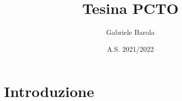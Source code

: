 \documentclass{article}
\title{Tesina PCTO}
\author{Gabriele Barola}
\date{A.S. 2021/2022}
\begin{document}
\maketitle

\section{Introduzione}



\end{document}
